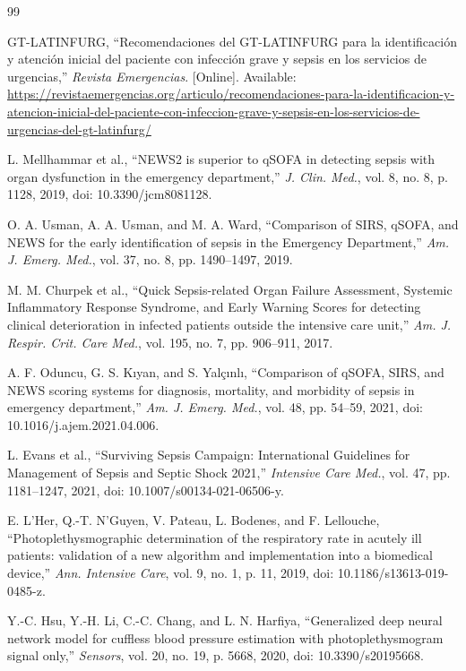 \documentclass[11pt,a4paper]{article}
\begin{document}
\begin{thebibliography}{99}

GT-LATINFURG, ``Recomendaciones del GT-LATINFURG para la identificación y atención inicial del paciente con infección grave y sepsis en los servicios de urgencias,'' \textit{Revista Emergencias}. [Online]. Available: \url{https://revistaemergencias.org/articulo/recomendaciones-para-la-identificacion-y-atencion-inicial-del-paciente-con-infeccion-grave-y-sepsis-en-los-servicios-de-urgencias-del-gt-latinfurg/}

L. Mellhammar et al., ``NEWS2 is superior to qSOFA in detecting sepsis with organ dysfunction in the emergency department,'' \textit{J. Clin. Med.}, vol. 8, no. 8, p. 1128, 2019, doi: 10.3390/jcm8081128.

O. A. Usman, A. A. Usman, and M. A. Ward, ``Comparison of SIRS, qSOFA, and NEWS for the early identification of sepsis in the Emergency Department,'' \textit{Am. J. Emerg. Med.}, vol. 37, no. 8, pp. 1490--1497, 2019.

M. M. Churpek et al., ``Quick Sepsis-related Organ Failure Assessment, Systemic Inflammatory Response Syndrome, and Early Warning Scores for detecting clinical deterioration in infected patients outside the intensive care unit,'' \textit{Am. J. Respir. Crit. Care Med.}, vol. 195, no. 7, pp. 906--911, 2017.

A. F. Oduncu, G. S. Kıyan, and S. Yalçınlı, ``Comparison of qSOFA, SIRS, and NEWS scoring systems for diagnosis, mortality, and morbidity of sepsis in emergency department,'' \textit{Am. J. Emerg. Med.}, vol. 48, pp. 54--59, 2021, doi: 10.1016/j.ajem.2021.04.006.

L. Evans et al., ``Surviving Sepsis Campaign: International Guidelines for Management of Sepsis and Septic Shock 2021,'' \textit{Intensive Care Med.}, vol. 47, pp. 1181--1247, 2021, doi: 10.1007/s00134-021-06506-y.

E. L'Her, Q.-T. N'Guyen, V. Pateau, L. Bodenes, and F. Lellouche, ``Photoplethysmographic determination of the respiratory rate in acutely ill patients: validation of a new algorithm and implementation into a biomedical device,'' \textit{Ann. Intensive Care}, vol. 9, no. 1, p. 11, 2019, doi: 10.1186/s13613-019-0485-z.

Y.-C. Hsu, Y.-H. Li, C.-C. Chang, and L. N. Harfiya, ``Generalized deep neural network model for cuffless blood pressure estimation with photoplethysmogram signal only,'' \textit{Sensors}, vol. 20, no. 19, p. 5668, 2020, doi: 10.3390/s20195668.


\end{thebibliography}
\end{document}
